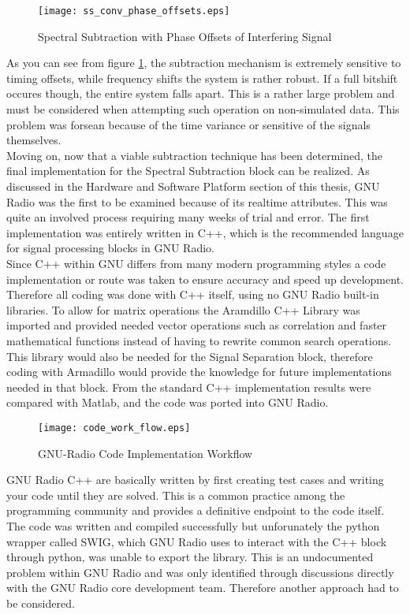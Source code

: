 \begin{figure}[!ht]\label{shifting}
\centering
\texttt{[image: ss\_conv\_phase\_offsets.eps]}
\caption{Spectral Subtraction with Phase Offsets of Interfering Signal}
\end{figure}

As you can see from figure \ref{shifting}, the subtraction mechanism is extremely sensitive to timing offsets, while frequency shifts the system is rather robust.  If a full bitshift occures though, the entire system falls apart.  This is a rather large problem and must be considered when attempting such operation on non-simulated data.  This problem was forsean because of the time variance or sensitive of the signals themselves. \\

Moving on, now that a viable subtraction technique has been determined, the final implementation for the Spectral Subtraction block can be realized.  As discussed in the Hardware and Software Platform section of this thesis, GNU Radio was the first to be examined because of its realtime attributes.  This was quite an involved process requiring many weeks of trial and error.  The first implementation was entirely written in C++, which is the recommended language for signal processing blocks in GNU Radio.\\  

Since C++ within GNU differs from many modern programming styles a code implementation or route was taken to ensure accuracy and speed up development.  Therefore all coding was done with C++ itself, using no GNU Radio built-in libraries\cite{gnuradioCPP}.  To allow for matrix operations the Aramdillo C++ Library\cite{armadillo} was imported and provided needed vector operations such as correlation and faster mathematical functions instead of having to rewrite common search operations.  This library would also be needed for the Signal Separation block, therefore coding with Armadillo would provide the knowledge for future implementations needed in that block.  From the standard C++ implementation results were compared with Matlab, and the code was ported into GNU Radio.\\

\begin{figure}[!ht] 
\centering
\texttt{[image: code\_work\_flow.eps]}
\caption{GNU-Radio Code Implementation Workflow}
\end{figure}

GNU Radio C++ are basically written by first creating test cases and writing your code until they are solved.  This is a common practice among the programming community and provides a definitive endpoint to the code itself.  The code was written and compiled successfully but unforunately the python wrapper called SWIG\cite{swig}, which GNU Radio uses to interact with the C++ block through python, was unable to export the library.  This is an undocumented problem within GNU Radio and was only identified through discussions directly with the GNU Radio core development team.  Therefore another approach had to be considered.\\

